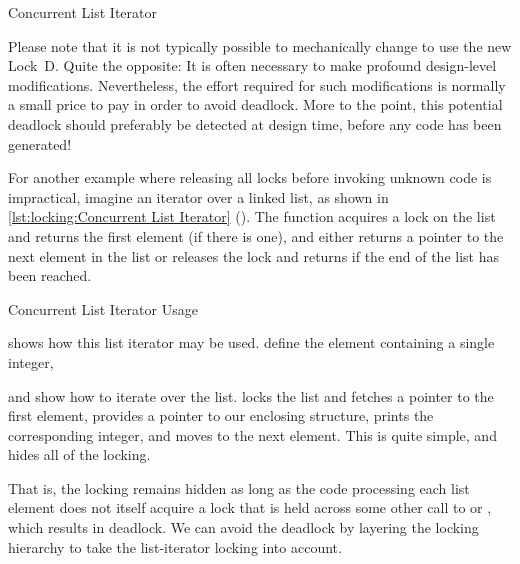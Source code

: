 \begin{listing}

\caption{Concurrent List Iterator}
\label{lst:locking:Concurrent List Iterator}
\end{listing}

Please note that it is not typically possible to mechanically
change  to use the new Lock~D\@.
Quite the opposite: It is often necessary to make profound design-level
modifications.
Nevertheless, the effort required for such modifications is normally
a small price to pay in order to avoid deadlock.
More to the point, this potential deadlock should preferably be detected
at design time, before any code has been generated!

For another example where releasing all locks before invoking unknown
code is impractical, imagine an iterator over a linked list, as shown in
\cref{lst:locking:Concurrent List Iterator} ().
The  function acquires a lock on the list and returns
the first element (if there is one), and
 either returns a pointer to the next element in the list
or releases the lock and returns  if the end of the list has
been reached.

\begin{listing}

\caption{Concurrent List Iterator Usage}
\label{lst:locking:Concurrent List Iterator Usage}
\end{listing}

\begin{fcvref}
 shows how
this list iterator may be used.
 define the  element
containing a single integer,
\end{fcvref}
\begin{fcvref}
and  show how to iterate over the list.
 locks the list and fetches a pointer to the first element,
 provides a pointer to our enclosing  structure,
 prints the corresponding integer, and
 moves to the next element.
This is quite simple, and hides all of the locking.
\end{fcvref}

That is, the locking remains hidden as long as the code processing each
list element does not itself acquire a lock that is held across some
other call to  or , which results in
deadlock.
We can avoid the deadlock by layering the locking hierarchy
to take the list-iterator locking into account.


